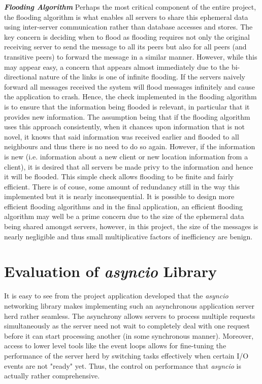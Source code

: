 \noindent\textbf{\emph{Flooding Algorithm}}\newline
Perhaps the most critical component of the entire project, the flooding algorithm is what enables all servers to share this ephemeral data using inter-server communication rather than database accesses and stores. The key concern is deciding when to flood as flooding requires not only the original receiving server to send the message to all its peers but also for all peers (and transitive peers) to forward the message in a similar manner. However, while this may appear easy, a concern that appears almost immediately due to the bi-directional nature of the links is one of infinite flooding. If the servers naively forward all messages received the system will flood messages infinitely and cause the application to crash. Hence, the check implemented in the flooding algorithm is to ensure that the information being flooded is relevant, in particular that it provides new information. The assumption being that if the flooding algorithm uses this approach consistently, when it chances upon information that is not novel, it knows that said information was received earlier and flooded to all neighbours and thus there is no need to do so again. However, if the information is new (i.e. information about a new client or new location information from a client), it is desired that all servers be made privy to the information and hence it will be flooded. This simple check allows flooding to be finite and fairly efficient. There is of couse, some amount of redundancy still in the way this implemented but it is nearly inconsequential. It is possible to design more efficient flooding algorithms and in the final application, an efficient flooding algorithm may well be a prime concern due to the size of the ephemeral data being shared amongst servers, however, in this project, the size of the messages is nearly negligible and thus small multiplicative factors of inefficiency are benign. 

\section{Evaluation of \emph{asyncio} Library}
It is easy to see from the project application developed that the \emph{asyncio} networking library makes implementing such an asynchronous application server herd rather seamless. The asynchrony allows servers to process multiple requests simultaneously as the server need not wait to completely deal with one request before it can start processing another (in some synchronous manner). Moreover, access to lower level tools like the event loops allows for fine-tuning the performance of the server herd by switching tasks effectively when certain I/O events are not "ready" yet. Thus, the control on performance that \emph{asyncio} is actually rather comprehensive. \newline

